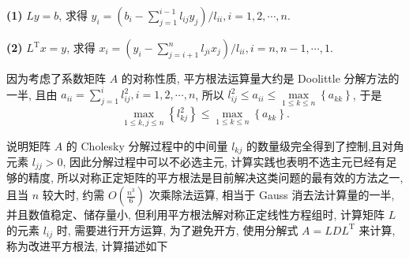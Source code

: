 \textbf{(1)} $ L y=b $, 求得 $ y_{i}=\left(b_{i}-\sum\limits_{j=1}^{i-1} l_{i j} y_{j}\right) / l_{i i}, i=1,2, \cdots, n $.

\textbf{(2)} $ L^{\mathrm{T}} x=y $, 求得 $ x_{i}=\left(y_{i}-\sum\limits_{j=i+1}^{n} l_{j i} x_{j}\right) / l_{i i}, i=n, n-1, \cdots, 1 $.

因为考虑了系数矩阵 $ A $ 的对称性质, 平方根法运算量大约是 Doolittle 分解方法的一半, 且由 $ a_{i i}=\sum\limits_{j=1}^{i} l_{i j}^{2}, i=1,2, \cdots, n $, 所以 $ l_{i j}^{2} \leqslant a_{i i} \leqslant \max\limits _{1 \leqslant k \leqslant n}\left\{a_{k k}\right\} $, 于是
$$
\max _{1 \leqslant k, j \leqslant n}\left\{l_{k j}^{2}\right\} \leqslant \max _{1 \leqslant k \leqslant n}\left\{a_{k k}\right\} .
$$

说明矩阵 $ A $ 的 Cholesky 分解过程中的中间量 $ l_{k j} $ 的数量级完全得到了控制,且对角元素 $ l_{j j}>0 $, 因此分解过程中可以不必选主元, 计算实践也表明不选主元已经有足够的精度, 所以对称正定矩阵的平方根法是目前解决这类问题的最有效的方法之一, 且当 $ n $ 较大时, 约需 $ O\left(\frac{n^{3}}{6}\right) $ 次乘除法运算, 相当于 Gauss 消去法计算量的一半, 并且数值稳定、储存量小, 但利用平方根法解对称正定线性方程组时, 计算矩阵 $ L $ 的元素 $ l_{i j} $ 时, 需要进行开方运算, 为了避免开方, 使用分解式 $ A=L D L^{\mathrm{T}} $ 来计算, 称为改进平方根法, 计算描述如下

